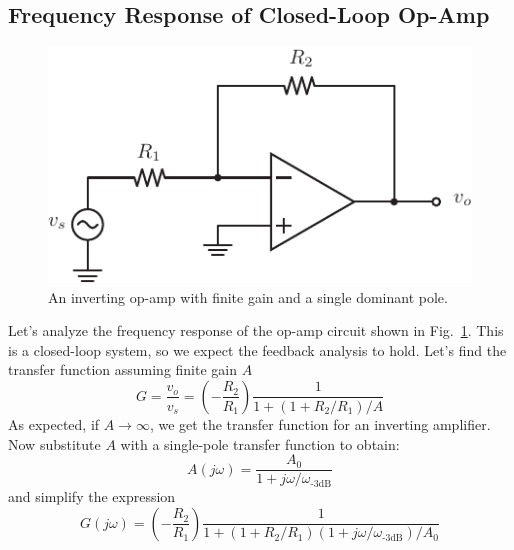 \subsection{Frequency Response of Closed-Loop Op-Amp}

\begin{figure}[tb]
\begin{center}
\includegraphics[scale=1]{opamp_invert_gain}
\end{center}
\caption{An inverting op-amp with finite gain and a single dominant pole.} \label{fig:opamp_invert_gain}
\end{figure}


Let's analyze the frequency response of the op-amp circuit shown in Fig.~\ref{fig:opamp_invert_gain}.  This is a closed-loop system, so we expect the feedback analysis to hold.  Let's find the transfer function assuming finite gain $A$
%
\begin{equation}
  G = \frac{v_o}{v_s} = \left(-\frac{R_2}{R_1}\right) \frac{1}{1 + (1+R_2/R_1)/A}
\end{equation}
%
As expected, if $A \rightarrow \infty$, we get the transfer function for an inverting amplifier.  Now  substitute $A$ with a single-pole transfer function to obtain:
%
\begin{equation} 
	A(j\omega) = \frac{A_0}{1 + j\omega/\omega_{\text{-3dB}}} \end{equation}
%
and simplify the expression 
%
\begin{equation}
  G(j\omega) = \left(-\frac{R_2}{R_1}\right)  \frac{1}{1 + (1+R_2/R_1)(1+ j\omega/\omega_\text{-3dB})/A_0}
\end{equation}

